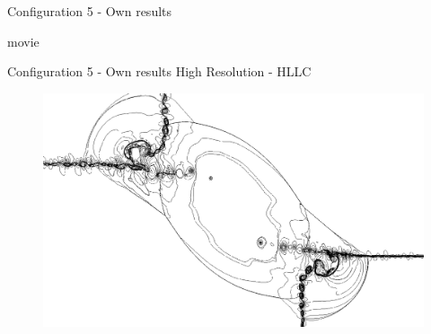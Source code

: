 \begin{frame}{Configuration 5 - Own results}
	
movie
	
	
\end{frame}

\begin{frame}{Configuration 5 - Own results}
	High Resolution - HLLC
	
\begin{figure}
\centering
\includegraphics[width=0.7\linewidth]{../../figs/Configuration5_HighRes}
\label{fig:Configuration5_HighRes}
\end{figure}

\end{frame}
	